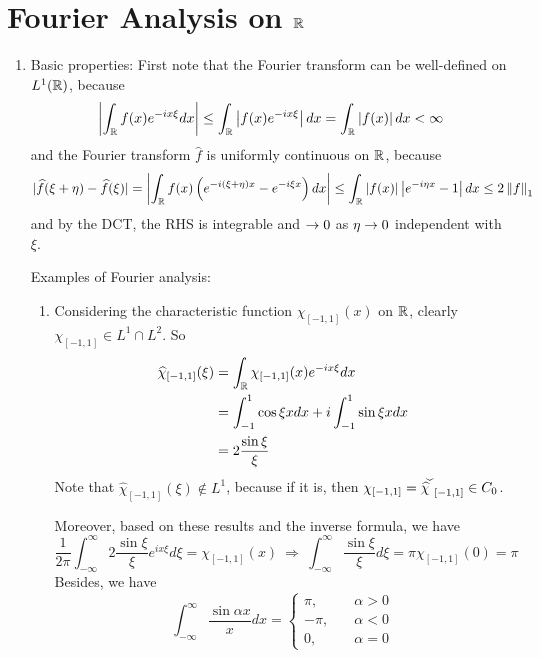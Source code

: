 \section{Fourier Analysis on \texorpdfstring{$\mathbb{R}$}{R}}

\begin{enumerate}[label=\arabic*.]
	\item Basic properties: First note that the Fourier transform can be well-defined on $L^1(\mathbb{R})$, because
	\begin{equation*}
		\left\lvert\int_{\mathbb{R}} f(x)e^{-ix\xi}dx\right\lvert \leq \int_{\mathbb{R}} \left\lvert f(x)e^{-ix\xi}\right\lvert dx = \int_{\mathbb{R}} \left\lvert f(x)\right\lvert dx < \infty
	\end{equation*}
	and the Fourier transform $\widehat{f}$ is uniformly continuous on $\mathbb{R}$, because
	\begin{equation*}
		|\widehat{f}(\xi+\eta)-\widehat{f}(\xi)|=\left|\int_{\mathbb{R}} f(x)\left(e^{-i(\xi+\eta) x}-e^{-i \xi x}\right) d x\right| \leq \int_{\mathbb{R}}|f(x)|\left|e^{-i \eta x}-1\right| d x \leq 2\left\lVert f\right\lVert_1
	\end{equation*}
	and by the DCT, the RHS is integrable and $\rightarrow 0$ as $\eta \rightarrow 0$ independent with $\xi$. 

	\noindent Examples of Fourier analysis: 
	\begin{enumerate}[label=(\arabic*)]
		\item Considering the characteristic function $\chi_{[-1,1]}(x)$ on $\mathbb{R}$, clearly $\chi_{[-1,1]} \in L^1\cap L^2$. So
		\begin{equation*}
			\begin{aligned}
				\widehat{\chi}_{[-1,1]}(\xi) &= \int_{\mathbb{R}} \chi_{[-1,1]}(x)e^{-ix\xi}dx \\
				&= \int_{-1}^1 \cos \xi x dx + i\int_{-1}^1 \sin \xi x dx \\
				&= 2 \frac{\sin \xi}{\xi}
			\end{aligned}
		\end{equation*}
		Note that $\widehat{\chi}_{[-1,1]}(\xi) \notin L^1$, because if it is, then $\chi_{[-1,1]}=\widecheck{\widehat{\chi}}_{[-1,1]} \in C_0$.

		\noindent Moreover, based on these results and the inverse formula, we have
		\begin{equation*}
			\frac{1}{2 \pi} \int_{-\infty}^\infty 2\frac{\sin \xi}{\xi}e^{ix\xi} d\xi = \chi_{[-1,1]}(x) ~\Rightarrow~ \int_{-\infty}^\infty \frac{\sin \xi}{\xi} d\xi =\pi \chi_{[-1,1]}(0) = \pi
		\end{equation*}
		Besides, we have
		\begin{equation*}
			\int_{-\infty}^\infty \frac{\sin \alpha x}{x} dx = \left \{ 
				\begin{aligned}
					\pi,\quad&\alpha > 0 \\
					-\pi,\quad&\alpha < 0 \\
					0,\quad&\alpha = 0
				\end{aligned}
			\right.
		\end{equation*}


\end{enumerate}
\end{enumerate}
